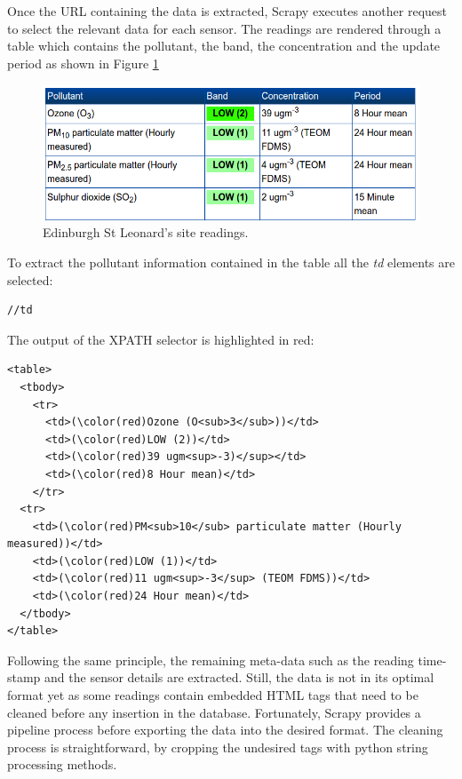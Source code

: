 Once the URL containing the data is extracted, Scrapy executes another request to select the relevant data for each sensor. The readings are rendered through a table which contains the pollutant, the band, the concentration and the update period as shown in Figure \ref{fig:pollution_site readings}

\begin{figure}[H]
\begin{adjustbox}{width=.5\textwidth,center=\textwidth}
  \centering
  \includegraphics[scale=1]{images/site_readings.png}
\end{adjustbox}
  \caption[Edinburgh St Leonard's site readings]{Edinburgh St Leonard's site readings.\footnotemark}
  \label{fig:pollution_site readings}
\end{figure}

To extract the pollutant information contained in the table all the \textit{td} elements are selected: 

{\centering
\begin{BVerbatim}
//td
\end{BVerbatim}
\par
}\bigskip

The output of the XPATH selector is highlighted in red: 

\begin{Verbatim}[fontsize=\small,commandchars=\\\(\)]
<table>
  <tbody>
    <tr>
      <td>(\color(red)Ozone (O<sub>3</sub>))</td>
      <td>(\color(red)LOW (2))</td>
      <td>(\color(red)39 ugm<sup>-3)</sup></td>
      <td>(\color(red)8 Hour mean)</td>
    </tr>
  <tr>
    <td>(\color(red)PM<sub>10</sub> particulate matter (Hourly measured))</td>
    <td>(\color(red)LOW (1))</td>
    <td>(\color(red)11 ugm<sup>-3</sup> (TEOM FDMS))</td>
    <td>(\color(red)24 Hour mean)</td>
  </tbody>
</table>                
\end{Verbatim}

Following the same principle, the remaining meta-data such as the reading time-stamp and the sensor details are extracted. Still, the data is not in its optimal format yet as some readings contain embedded HTML tags that need to be cleaned before any insertion in the database. Fortunately, Scrapy provides a pipeline process before exporting the data into the desired format. The cleaning process is straightforward, by cropping the undesired tags with python string processing methods. 

